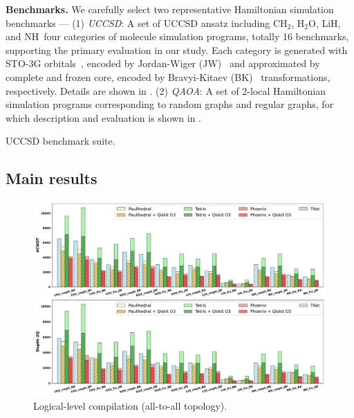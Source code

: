 \documentclass[conference]{IEEEtran}
\newcommand{\CHtwo}{CH$_2$}
\newcommand{\HtwoO}{H$_2$O}
\newcommand{\LiH}{LiH}
\newcommand{\NH}{NH}
\begin{document}
    \textbf{Benchmarks.} We carefully select two representative Hamiltonian simulation benchmarks --- (1) \emph{UCCSD}: A set of UCCSD ansatz including \CHtwo, \HtwoO, \LiH, and \NH\ four categories of molecule simulation programs, totally 16 benchmarks, supporting the primary evaluation in our study. Each category is generated with STO-3G orbitals~\cite{hehre1969self}, encoded by Jordan-Wiger (JW)~\cite{jordan1928paulische} and approximated by complete and frozen core, encoded by Bravyi-Kitaev (BK)~\cite{bravyi2002fermionic} transformations, respectively. Details are shown in . (2) \emph{QAOA}: A set of 2-local Hamiltonian simulation programs corresponding to random graphs and regular graphs, for which description and evaluation is shown in .
    

    \begin{table}[tbp]
        \centering
        \caption{UCCSD benchmark suite.}
        \setlength{\tabcolsep}{4.2pt}
        \scalebox{0.85}{
            
        }
        \label{tab:uccsd}
        
    \end{table}
    




\subsection{Main results}


    \begin{figure}[tbp]
        \centering
        \includegraphics[width=\columnwidth]{figures/all2all.pdf}
        \caption{Logical-level compilation (all-to-all topology).}
        \label{fig:all2all}
    \end{figure}
\end{document}
